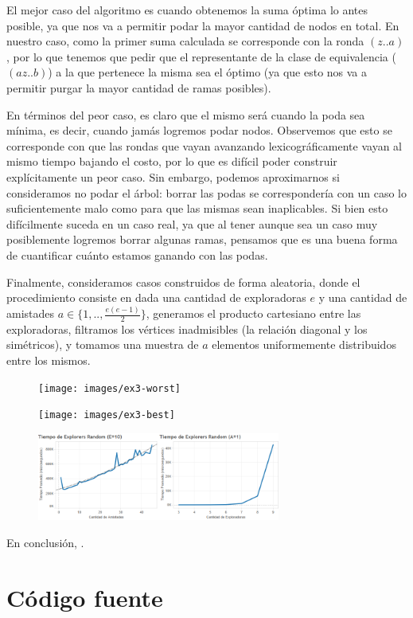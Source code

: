 \documentclass{article}
\theoremstyle{definition}
\theoremstyle{remark}
\begin{document}
El mejor caso del algoritmo es cuando obtenemos la suma óptima lo antes posible, ya que nos va a permitir podar la mayor cantidad de nodos en total. En nuestro caso, como la primer suma calculada se corresponde con la ronda $(z..a)$, por lo que tenemos que pedir que el representante de la clase de equivalencia ($(a z .. b)$) a la que pertenece la misma sea el óptimo (ya que esto nos va a permitir purgar la mayor cantidad de ramas posibles).

En términos del peor caso, es claro que el mismo será cuando la poda sea mínima, es decir, cuando jamás logremos podar nodos. Observemos que esto se corresponde con que las rondas que vayan avanzando lexicográficamente vayan al mismo tiempo bajando el costo, por lo que es difícil poder construir explícitamente un peor caso. Sin embargo, podemos aproximarnos si consideramos no podar el árbol: borrar las podas se correspondería con un caso lo suficientemente malo como para que las mismas sean inaplicables. Si bien esto difícilmente suceda en un caso real, ya que al tener aunque sea un caso muy posiblemente logremos borrar algunas ramas, pensamos que es una buena forma de cuantificar cuánto estamos ganando con las podas.

Finalmente, consideramos casos construidos de forma aleatoria, donde el procedimiento consiste en dada una cantidad de exploradoras $e$ y una cantidad de amistades $a \in \{1, .., \frac{e(e-1)}{2}\}$, generamos el producto cartesiano entre las exploradoras, filtramos los vértices inadmisibles (la relación diagonal y los simétricos), y tomamos una muestra de $a$ elementos uniformemente distribuidos entre los mismos.

\begin{figure}[h!]
\centering
\label{grf:ex3-worst}
\texttt{[image: images/ex3-worst]}
\caption{}
\end{figure}

\begin{figure}[h!]
\centering
\label{grf:ex3-best}
\texttt{[image: images/ex3-best]}
\caption{}
\end{figure}

\begin{figure}[h!]
\centering
\label{grf:ex3-random}
\includegraphics[width=8cm]{images/ex3-random}
\caption{}
\end{figure}


En conclusión, .

\section{Código fuente}
\end{document}
